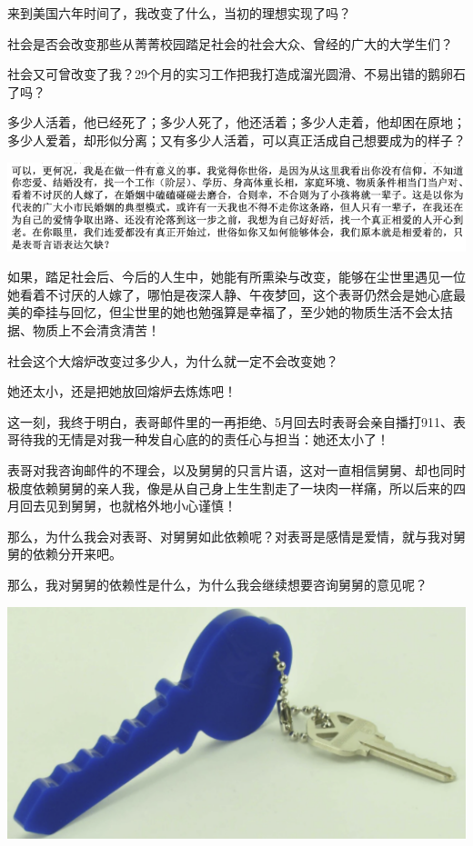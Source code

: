 \documentclass[9pt, b5paper]{article}
\begin{document}
来到美国六年时间了，我改变了什么，当初的理想实现了吗？

社会是否会改变那些从菁菁校园踏足社会的社会大众、曾经的广大的大学生们？

社会又可曾改变了我？29个月的实习工作把我打造成溜光圆滑、不易出错的鹅卵石了吗？

多少人活着，他已经死了；多少人死了，他还活着；多少人走着，他却困在原地；多少人爱着，却形似分离；又有多少人活着，可以真正活成自己想要成为的样子？

\begin{center}
\includegraphics[width=.9\linewidth]{./pic/backups_plans_20210415_110528.png}
\end{center}

如果，踏足社会后、今后的人生中，她能有所熏染与改变，能够在尘世里遇见一位她看着不讨厌的人嫁了，哪怕是夜深人静、午夜梦回，这个表哥仍然会是她心底最美的牵挂与回忆，但尘世里的她也勉强算是幸福了，至少她的物质生活不会太拮据、物质上不会清贪清苦！

社会这个大熔炉改变过多少人，为什么就一定不会改变她？

她还太小，还是把她放回熔炉去炼炼吧！

这一刻，我终于明白，表哥邮件里的一再拒绝、5月回去时表哥会亲自播打911、表哥待我的无情是对我一种发自心底的的责任心与担当：她还太小了！

表哥对我咨询邮件的不理会，以及舅舅的只言片语，这对一直相信舅舅、却也同时极度依赖舅舅的亲人我，像是从自己身上生生割走了一块肉一样痛，所以后来的四月回去见到舅舅，也就格外地小心谨慎！

那么，为什么我会对表哥、对舅舅如此依赖呢？对表哥是感情是爱情，就与我对舅舅的依赖分开来吧。

那么，我对舅舅的依赖性是什么，为什么我会继续想要咨询舅舅的意见呢？

\begin{center}
\includegraphics[width=.9\linewidth]{./pic/backups_plans_20210415_113132.png}
\end{center}
\end{document}
